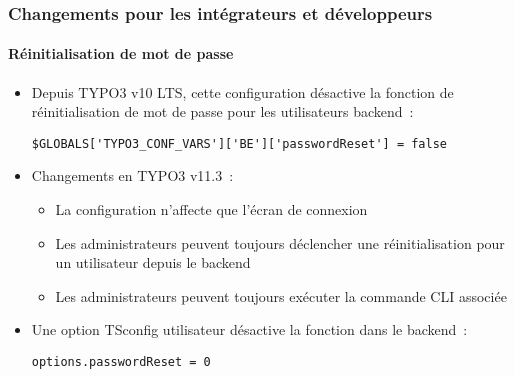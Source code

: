 %

\begin{frame}[fragile]
	\frametitle{Changements pour les intégrateurs et développeurs}
	\framesubtitle{Réinitialisation de mot de passe}


	\begin{itemize}
		\item Depuis TYPO3 v10 LTS, cette configuration désactive la
			fonction de réinitialisation de mot de passe pour les utilisateurs backend~:
\begin{lstlisting}
$GLOBALS['TYPO3_CONF_VARS']['BE']['passwordReset'] = false
\end{lstlisting}

		\item Changements en TYPO3 v11.3~:

		 	\begin{itemize}
				\item La configuration n'affecte que l'écran de connexion
				\item Les administrateurs peuvent toujours déclencher une réinitialisation pour un utilisateur depuis le backend
				\item Les administrateurs peuvent toujours exécuter la commande CLI associée
			\end{itemize}

		\item Une option TSconfig utilisateur désactive la fonction dans le backend~:
\begin{lstlisting}
options.passwordReset = 0
\end{lstlisting}

	\end{itemize}

\end{frame}

